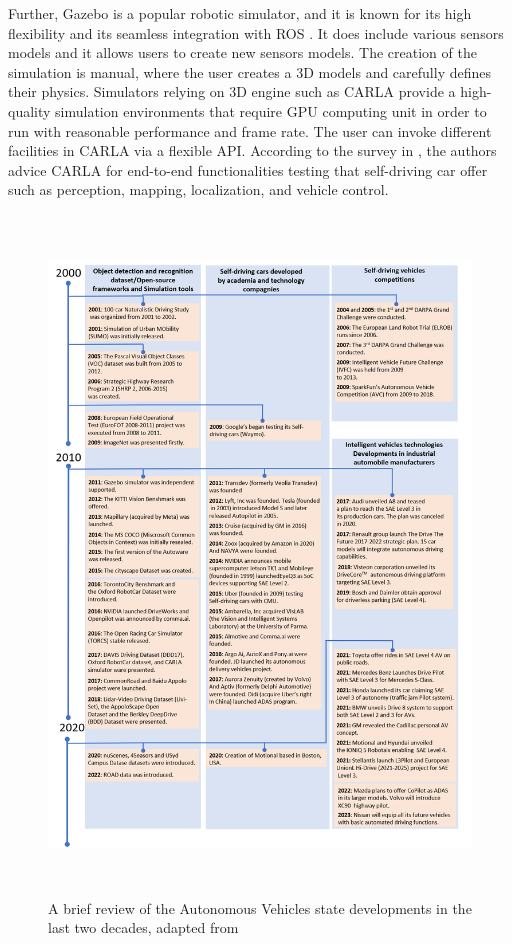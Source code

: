 Further, Gazebo \cite{Gazebo} is a popular robotic simulator, and it  is known for its high flexibility and its seamless integration with ROS \cite{ROS}. It does include various sensors models and it allows users to create new sensors models. The creation of the simulation is manual, where the user creates a 3D models and carefully defines their physics. Simulators relying on 3D engine such as CARLA provide a high-quality simulation environments that require GPU computing unit in order to run with reasonable performance and frame rate. The user can invoke different facilities in CARLA \cite{Carla} via a flexible API. According to the survey in \cite{kaur2021survey}, the authors advice CARLA for end-to-end functionalities testing that self-driving car offer such as perception, mapping, localization, and vehicle control. 

\begin{figure}[]
        \centering 
        \includegraphics[width=22cm,height=18cm,keepaspectratio]{chapters/Chapitre_2/Figures/State_of_Art.png}
        \vspace{-2.3mm}
    \caption{A brief review of the Autonomous Vehicles state developments in the last two decades, adapted from \cite{zhu2022hierarchical}}
        \label{fig:State_of_the_art}
                \vspace{-5mm}
        \end{figure} \newpage


